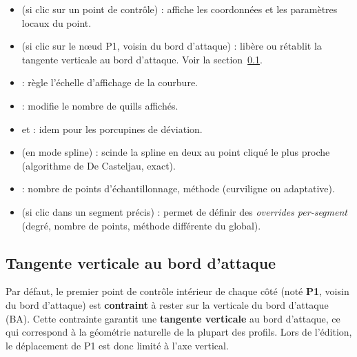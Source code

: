 \begin{itemize}
    \item {} (si clic sur un point de contrôle) :
        affiche les coordonnées et les paramètres locaux du point.
    \item {} (si clic sur le nœud P1, voisin du bord d'attaque) :
        libère ou rétablit la tangente verticale au bord d'attaque.
        Voir la section~\ref{sec:batangente}.
    \item {} : règle l'échelle
        d'affichage de la courbure.
    \item {} :
        modifie le nombre de quills affichés.
    \item {} et  :
        idem pour les porcupines de déviation.
    \item {} (en mode spline) :
        scinde la spline en deux au point cliqué le plus proche
        (algorithme de De Casteljau, exact).
    \item {} : nombre de points
        d'échantillonnage, méthode (curviligne ou adaptative).
    \item {} (si clic dans un segment précis) :
        permet de définir des \emph{overrides per-segment}
        (degré, nombre de points, méthode différente du global).
\end{itemize}

\subsection{Tangente verticale au bord d'attaque}
\label{sec:batangente}

Par défaut, le premier point de contrôle intérieur de chaque côté
(noté \textbf{P1}, voisin du bord d'attaque) est \textbf{contraint}
à rester sur la verticale du bord d'attaque (BA). Cette contrainte
garantit une \textbf{tangente verticale} au bord d'attaque, ce qui
correspond à la géométrie naturelle de la plupart des profils. Lors
de l'édition, le déplacement de P1 est donc limité à l'axe vertical.


